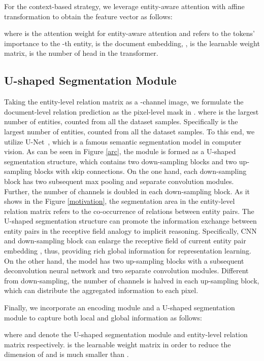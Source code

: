 \documentclass{article}
\begin{document}
For the context-based strategy, we leverage entity-aware attention with affine transformation to obtain the feature vector as follows:

 
 where  is the attention weight for entity-aware attention and  refers to the tokens' importance to the -th entity,  is the document embedding, ,  is the learnable weight matrix,  is the number of head in the transformer. 

\subsection{U-shaped Segmentation Module}
Taking the entity-level relation  matrix  as a -channel image, we formulate the document-level relation prediction  as the pixel-level mask in . where  is the largest number of entities, counted from all the dataset samples. Specifically  is the largest number of entities, counted from all the dataset samples. To this end, we utilize U-Net~\cite{RFB15a}, which is a famous semantic segmentation model in computer vision. 
As can be seen in Figure \ref{arc},
the module is formed as a U-shaped segmentation structure, which contains two down-sampling blocks and two up-sampling blocks with skip connections. On the one hand, each down-sampling block has two subsequent max pooling and separate convolution modules. Further, the number of channels is doubled in each down-sampling block.
As it shows in the Figure \ref{motivation}, 
the segmentation area in the entity-level relation matrix refers to the co-occurrence of relations between entity pairs. The U-shaped segmentation structure can promote the information exchange between entity pairs in the receptive field analogy to implicit reasoning. Specifically, CNN and down-sampling block can enlarge the receptive field of current entity pair embedding , thus, providing rich global information for representation learning. 
On the other hand, the model has two up-sampling blocks with a subsequent deconvolution neural network and two separate convolution modules. Different from down-sampling, the number of channels is halved in each up-sampling block, which can distribute the aggregated information to each pixel.

Finally, we incorporate an encoding module and a U-shaped segmentation module to capture both local and global information  as follows:

where  and   denote the U-shaped segmentation module and entity-level relation matrix respectively.  is the learnable weight matrix in order to reduce the dimension of  and  is much smaller than .
\end{document}
